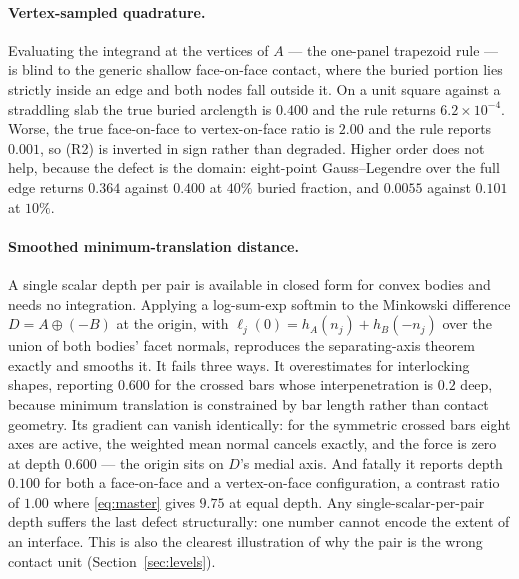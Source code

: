 \documentclass[11pt]{article}
\begin{document}
\paragraph{Vertex-sampled quadrature.} Evaluating the integrand at the vertices of $A$ --- the one-panel trapezoid rule --- is blind to the generic shallow face-on-face contact, where the buried portion lies strictly inside an edge and both nodes fall outside it. On a unit square against a straddling slab the true buried arclength is $0.400$ and the rule returns $6.2\times10^{-4}$. Worse, the true face-on-face to vertex-on-face ratio is $2.00$ and the rule reports $0.001$, so (R2) is inverted in sign rather than degraded. Higher order does not help, because the defect is the domain: eight-point Gauss--Legendre over the full edge returns $0.364$ against $0.400$ at $40\%$ buried fraction, and $0.0055$ against $0.101$ at $10\%$.

\paragraph{Smoothed minimum-translation distance.} A single scalar depth per pair is available in closed form for convex bodies and needs no integration. Applying a log-sum-exp softmin to the Minkowski difference $D = A\oplus(-B)$ at the origin, with $\ell_j(0) = h_A(n_j)+h_B(-n_j)$ over the union of both bodies' facet normals, reproduces the separating-axis theorem exactly and smooths it. It fails three ways. It overestimates for interlocking shapes, reporting $0.600$ for the crossed bars whose interpenetration is $0.2$ deep, because minimum translation is constrained by bar length rather than contact geometry. Its gradient can vanish identically: for the symmetric crossed bars eight axes are active, the weighted mean normal cancels exactly, and the force is zero at depth $0.600$ --- the origin sits on $D$'s medial axis. And fatally it reports depth $0.100$ for both a face-on-face and a vertex-on-face configuration, a contrast ratio of $1.00$ where \eqref{eq:master} gives $9.75$ at equal depth. Any single-scalar-per-pair depth suffers the last defect structurally: one number cannot encode the extent of an interface. This is also the clearest illustration of why the pair is the wrong contact unit (Section~\ref{sec:levels}).
\end{document}
